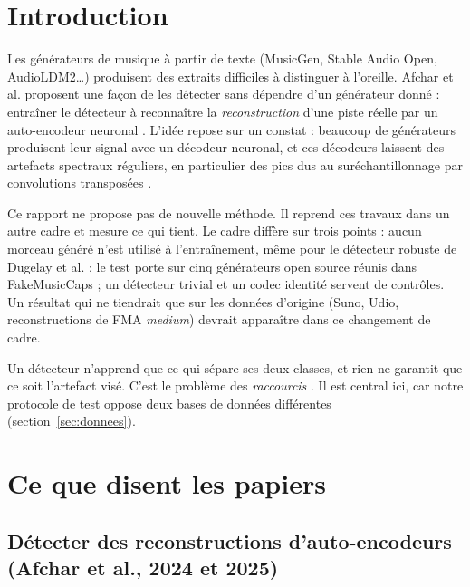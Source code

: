 \documentclass[a4paper, 11pt]{article}
\begin{document}
\vspace{1em}
\tableofcontents
\newpage

\section{Introduction}

Les générateurs de musique à partir de texte (MusicGen, Stable Audio Open, AudioLDM2\dots) produisent des
extraits difficiles à distinguer à l'oreille. Afchar et al. proposent une façon de les détecter sans dépendre
d'un générateur donné : entraîner le détecteur à reconnaître la \emph{reconstruction} d'une piste réelle par un
auto-encodeur neuronal \cite{afchar2024easy, afchar2025challenges}. L'idée repose sur un constat : beaucoup de
générateurs produisent leur signal avec un décodeur neuronal, et ces décodeurs laissent des artefacts spectraux
réguliers, en particulier des pics dus au suréchantillonnage par convolutions transposées
\cite{pons2021upsampling, afchar2025fourier}.

Ce rapport ne propose pas de nouvelle méthode. Il reprend ces travaux dans un autre cadre et mesure ce qui
tient. Le cadre diffère sur trois points : aucun morceau généré n'est utilisé à l'entraînement, même pour le
détecteur robuste de Dugelay et al. \cite{dugelay2026robustness} ; le test porte sur cinq générateurs open
source réunis dans FakeMusicCaps ; un détecteur trivial et un codec identité servent de contrôles. Un résultat
qui ne tiendrait que sur les données d'origine (Suno, Udio, reconstructions de FMA \emph{medium}) devrait
apparaître dans ce changement de cadre.

Un détecteur n'apprend que ce qui sépare ses deux classes, et rien ne garantit que ce soit l'artefact visé. C'est
le problème des \emph{raccourcis} \cite{geirhos2020shortcut}. Il est central ici, car notre protocole de test
oppose deux bases de données différentes (section~\ref{sec:donnees}).

\section{Ce que disent les papiers}
\label{sec:papiers}

\subsection{Détecter des reconstructions d'auto-encodeurs (Afchar et al., 2024 et 2025)}
\end{document}
